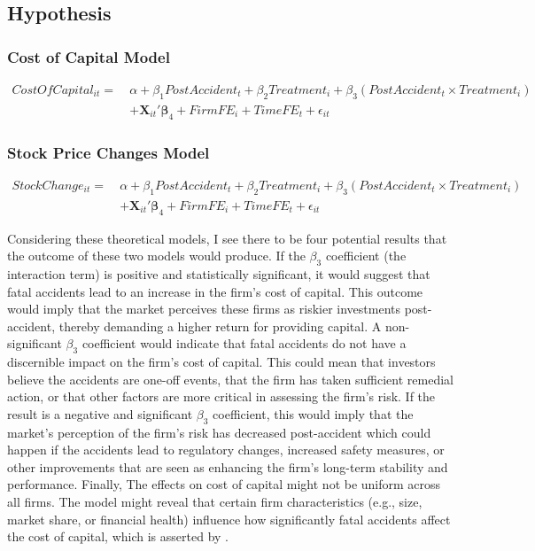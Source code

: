 \documentclass[12pt,a4paper]{article}
\begin{document}
\subsection{Hypothesis}
\begin{singlespace}
    \subsubsection{Cost of Capital Model}
\begin{align}
    CostOfCapital_{it} =\ &\alpha + \beta_1 PostAccident_t + \beta_2 Treatment_i + \beta_3 (PostAccident_t \times Treatment_i) \nonumber \\
    &+ \mathbf{X}_{it}'\mathbf{\beta}_4 + FirmFE_i + TimeFE_t + \epsilon_{it}
\end{align}

\subsubsection{Stock Price Changes Model}
\begin{align}
    StockChange_{it} =\ &\alpha + \beta_1 PostAccident_t + \beta_2 Treatment_i + \beta_3 (PostAccident_t \times Treatment_i) \nonumber \\
    &+ \mathbf{X}_{it}'\mathbf{\beta}_4 + FirmFE_i + TimeFE_t + \epsilon_{it}
\end{align}
\end{singlespace}
    \hspace{1cm} Considering these theoretical models, I see there to be four potential results that the outcome of these two models would produce. If the $\beta_3$ coefficient (the interaction term) is positive and statistically significant, it would suggest that fatal accidents lead to an increase in the firm's cost of capital. This outcome would imply that the market perceives these firms as riskier investments post-accident, thereby demanding a higher return for providing capital. A non-significant $\beta_3$ coefficient would indicate that fatal accidents do not have a discernible impact on the firm's cost of capital. This could mean that investors believe the accidents are one-off events, that the firm has taken sufficient remedial action, or that other factors are more critical in assessing the firm's risk. If the result is a negative and significant $\beta_3$ coefficient, this would imply that the market's perception of the firm's risk has decreased post-accident which could happen if the accidents lead to regulatory changes, increased safety measures, or other improvements that are seen as enhancing the firm's long-term stability and performance. Finally, The effects on cost of capital might not be uniform across all firms. The model might reveal that certain firm characteristics (e.g., size, market share, or financial health) influence how significantly fatal accidents affect the cost of capital, which is asserted by \cite{RheeHaunschild2006}. \
    
\end{document}

